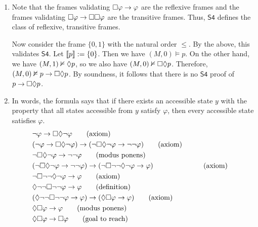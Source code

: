 \documentclass{article}
\begin{document}
\begin{ex}
\begin{enumerate}
\item Note that the frames validating $\square\varphi\to\varphi$ are the reflexive frames and the
frames validating $\square\varphi\to\square\square\varphi$ are the transitive frames. Thus, $\mathsf{S4}$
defines the class of reflexive, transitive frames. 

Now consider the frame $\{0,1\}$ with the natural order $\leq$. By the above, this validates $\mathsf{S4}$. Let $\llbracket p\rrbracket:=\{0\}$. Then we have $(M,0)\models p$. On the other hand, we have $(M,1)\nvDash\lozenge p$, so we also have $(M,0)\nvDash\square\lozenge p$. Therefore, $(M,0)\nvDash p\to\square\lozenge p$. By soundness, it follows
that there is no $\mathsf{S4}$ proof of $p\to\square\lozenge p$.
\item In words, the formula says that if there exists an accessible state $y$ with the property that all states accessible from $y$ satisfy $\varphi$, then every accessible state satisfies $\varphi$. 
\begin{align*}
& \neg\varphi\to\square\lozenge\neg\varphi
  \tag{axiom}
  \\
& (\neg\varphi\to\square\lozenge\neg\varphi)\to(\neg\square\lozenge\neg\varphi\to\neg\neg\varphi)
  \tag{axiom}
  \\
& \neg\square\lozenge\neg\varphi\to\neg\neg\varphi
  \tag{modus ponens}
  \\
& (\neg\square\lozenge\neg\varphi\to\neg\neg\varphi)\to(\neg\square\neg\neg\lozenge\neg\varphi\to\varphi)
  & &
  \tag{axiom}
  \\
& \neg\square\neg\neg\lozenge\neg\varphi\to\varphi
  \tag{axiom}
  \\
& \lozenge\neg\neg\square\neg\neg\varphi\to\varphi
  \tag{definition}
  \\
& (\lozenge\neg\neg\square\neg\neg\varphi\to\varphi)\to(\lozenge\square\varphi\to\varphi)
  \tag{axiom}
  \\
& \lozenge\square\varphi\to\varphi
  \tag{modus ponens}
  \\
& \lozenge\square\varphi\to\square\varphi
  \tag{goal to reach}
\end{align*} 
\end{enumerate}
\end{ex}
\end{document}
